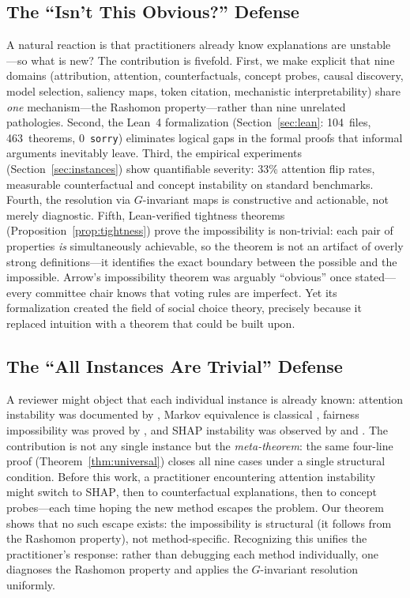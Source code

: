 \documentclass{article}
\newcommand{\SHAP}{\textsc{SHAP}}
\begin{document}
\subsection{The ``Isn't This Obvious?'' Defense}
\label{sec:obvious}

A natural reaction is that practitioners already know explanations are unstable
---so what is new?  The contribution is fivefold.  First, we make explicit that
nine domains (attribution, attention, counterfactuals, concept probes, causal
discovery, model selection, saliency maps, token citation, mechanistic
interpretability) share \emph{one}
mechanism---the Rashomon property---rather than nine unrelated pathologies.  Second, the Lean~4
formalization (Section~\ref{sec:lean}: 104~files, 463~theorems, 0~\texttt{sorry})
eliminates logical gaps in the formal proofs that informal arguments inevitably leave.  Third, the
empirical experiments (Section~\ref{sec:instances}) show quantifiable severity:
33\% attention flip rates, measurable counterfactual and concept instability on
standard benchmarks.  Fourth, the resolution via $G$-invariant maps is
constructive and actionable, not merely diagnostic.  Fifth, Lean-verified
tightness theorems (Proposition~\ref{prop:tightness}) prove the impossibility
is non-trivial: each pair of properties \emph{is} simultaneously achievable,
so the theorem is not an artifact of overly strong definitions---it identifies
the exact boundary between the possible and the impossible.
Arrow's impossibility
theorem \citep{arrow1951social} was arguably ``obvious'' once stated---every
committee chair knows that voting rules are imperfect.  Yet its formalization
created the field of social choice theory, precisely because it replaced
intuition with a theorem that could be built upon.

\subsection{The ``All Instances Are Trivial'' Defense}
\label{sec:trivial}

A reviewer might object that each individual instance is already known: attention
instability was documented by \citet{jainwallace2019}, Markov equivalence is
classical \citep{verma1991equivalence}, fairness impossibility was proved by
\citet{chouldechova2017fair}, and \SHAP{} instability was observed by
\citet{damour2022underspecification} and \citet{krishna2022disagreement}.  The
contribution is not any single instance but the \emph{meta-theorem}: the same
four-line proof (Theorem~\ref{thm:universal}) closes all nine cases under a
single structural condition.  Before this work, a practitioner encountering
attention instability might switch to \SHAP{}, then to counterfactual
explanations, then to concept probes---each time hoping the new method escapes
the problem.  Our theorem shows that no such escape exists: the impossibility
is structural (it follows from the Rashomon property), not method-specific.
Recognizing this unifies the practitioner's response: rather than debugging each
method individually, one diagnoses the Rashomon property and applies the
$G$-invariant resolution uniformly.
\end{document}
